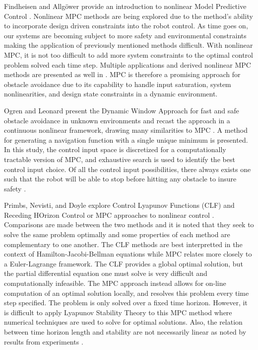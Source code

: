 \documentclass[12pt,onecolumn]{article}
\begin{document}
Findheisen and Allg{\"o}wer provide an introduction to nonlinear Model Predictive Control \cite{Allgower&Findeisen2002}. Nonlinear MPC methods are being explored due to the method's ability to incorporate design driven constraints into the robot control. As time goes on, our systems are becoming subject to more safety and environmental constraints making the application of previously mentioned methods difficult. With nonlinear MPC, it is not too difficult to add more system constraints to the optimal control problem solved each time step. Multiple applications and derived nonlinear MPC methods are presented as well in \cite{Allgower&Findeisen2002}. MPC is therefore a promising approach for obstacle avoidance due to its capability to handle input saturation, system nonlinearities, and design state constraints in a dynamic environment.

Ogren and Leonard present the Dynamic Window Approach for fast and safe obstacle avoidance in unknown environments and recast the approach in a continuous nonlinear framework, drawing many similarities to MPC \cite{Ogren&Leonard2005}. A method for generating a navigation function with a single unique minimum is presented. In this study, the control input space is discretized for a computationally tractable version of MPC, and exhaustive search is used to identify the best control input choice. Of all the control input possibilities, there always exists one such that the robot will be able to stop before hitting any obstacle to insure safety \cite{Ogren&Leonard2005}.

Primbs, Nevisti, and Doyle explore Control Lyapunov Functions (CLF) and Receding HOrizon Control or MPC approaches to nonlinear control \cite{Primbs&Nevistic1999}. Comparisons are made between the two methods and it is noted that they seek to solve the same problem optimally and some properties of each method are complementary to one another. The CLF methods are best interpretted in the context of Hamilton-Jacobi-Bellman equations while MPC relates more closely to a Euler-Lagrange framework. The CLF provides a global optimal solution, but the partial differential equation one must solve is very difficult and computationally infeasible. The MPC approach instead allows for on-line computation of an optimal solution locally, and resolves this problem every time step specified. The problem is only solved over a fixed time horizon. However, it is difficult to apply Lyapunov Stability Theory to this MPC method where numerical techniques are used to solve for optimal solutions. Also, the relation between time horizon length and stability are not necessarily linear as noted by results from experiments \cite{Primbs&Nevistic1999}. 
\end{document}
